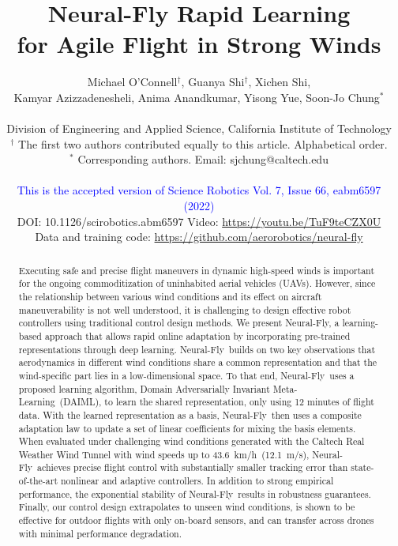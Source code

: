\documentclass[11pt]{article}
\date{}
\title{Neural-Fly \revB{Enables} Rapid Learning \\ for Agile Flight in Strong Winds}
\author
{Michael O'Connell$^{\dagger}$, Guanya Shi$^{\dagger}$, Xichen Shi, \\ Kamyar Azizzadenesheli, Anima Anandkumar, Yisong Yue, Soon-Jo Chung$^{*}$
\\
\\
\normalsize{Division of Engineering and Applied Science, California Institute of Technology} \\
\normalsize{$^\dagger$ The first two authors contributed equally to this article. Alphabetical order.} \\
\normalsize{$^*$ Corresponding authors. Email: sjchung@caltech.edu} \\
\\
\normalsize{\textcolor{blue}{This is the accepted version of Science Robotics Vol. 7, Issue 66, eabm6597 (2022)}}\\
\normalsize{DOI: 10.1126/scirobotics.abm6597 \quad Video: \url{https://youtu.be/TuF9teCZX0U}} \\
\normalsize{Data and training code: \url{https://github.com/aerorobotics/neural-fly}}
}
\newcommand{\rev}[1]{{#1}}
\newcommand{\revB}[1]{#1}
\newcommand{\nf}[0]{Neural-Fly}
\newcommand{\LearningAlg}[0]{Domain Adversarially Invariant Meta-Learning}
\newcommand{\DAML}[0]{DAIML}
\newcommand{\highwind}{\SI{43.6}{km/h}}
\newcommand{\highwindalt}{\SI{12.1}{m/s}}
\begin{document}
 


\maketitle 
\sectionfont{\MakeUppercase}

\begin{abstract}
Executing safe and precise flight maneuvers in dynamic high-speed winds is \revB{important} for the ongoing commoditization of uninhabited aerial vehicles (UAVs). However, since the relationship between various wind conditions and its \revB{effect} on aircraft maneuverability is not well understood, it is challenging to design effective robot controllers using traditional control design methods. We present \nf, a learning-based approach that allows rapid online adaptation by incorporating pre-trained representations through deep learning. \nf~builds on two key observations that aerodynamics in different wind conditions share a common representation and that the wind-specific part lies in a low-dimensional space. To that end, \nf~uses a \revB{proposed} learning algorithm, \LearningAlg~(\DAML), to learn the shared representation, only using 12 minutes of flight data. With the learned representation as a basis, \nf~then uses a composite adaptation law to update a set of linear coefficients for mixing the basis elements. When evaluated under challenging wind conditions generated with the Caltech Real Weather Wind Tunnel with wind speeds up to \rev{\highwind~(\highwindalt)}, \nf~achieves precise flight control with \revB{substantially} smaller tracking error than state-of-the-art nonlinear and adaptive controllers. In addition to strong empirical performance, the exponential stability of \nf~results in robustness guarantees.
Finally, our control design \rev{extrapolates to unseen wind conditions, is shown to be effective for outdoor flights with only on-board sensors}, and can transfer across drones with minimal performance degradation.
\end{abstract}





\end{document}
